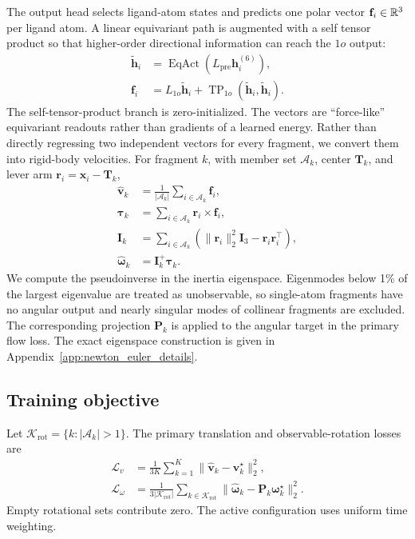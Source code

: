 The output head selects ligand-atom states and predicts one polar vector
\(\mathbf{f}_i\in\mathbb{R}^3\) per ligand atom. A linear equivariant path is augmented
with a self tensor product so that higher-order directional information can
reach the \(1o\) output:
\begin{align}
    \widetilde{\mathbf{h}}_i
    &=
    \operatorname{EqAct}
    (L_{\mathrm{pre}}\mathbf{h}_i^{(6)}),\\
    \mathbf{f}_i
    &=
    L_{1o}\widetilde{\mathbf{h}}_i
    +
    \operatorname{TP}_{1o}
    (\widetilde{\mathbf{h}}_i,\widetilde{\mathbf{h}}_i).
    \label{eq:atom_force_head}
\end{align}
The self-tensor-product branch is zero-initialized. The vectors are
``force-like'' equivariant readouts rather than gradients of a learned energy.
Rather than directly regressing two independent vectors for every fragment,
we convert them into rigid-body velocities. For fragment \(k\), with member set
\(\mathcal{A}_k\), center \(\mathbf{T}_k\), and lever arm
\(\mathbf{r}_i=\mathbf{x}_i-\mathbf{T}_k\),
\begin{align}
    \widehat{\mathbf{v}}_k
    &=
    \frac{1}{|\mathcal{A}_k|}
    \sum_{i\in\mathcal{A}_k}\mathbf{f}_i,
    \label{eq:newton_translation}\\
    \boldsymbol{\tau}_k
    &=
    \sum_{i\in\mathcal{A}_k}
    \mathbf{r}_i\times\mathbf{f}_i,\\
    \mathbf{I}_k
    &=
    \sum_{i\in\mathcal{A}_k}
    \left(
      \|\mathbf{r}_i\|_2^2\mathbf{I}_3
      -\mathbf{r}_i\mathbf{r}_i^\top
    \right),\\
    \widehat{\boldsymbol{\omega}}_k
    &=
    \mathbf{I}_k^{+}\boldsymbol{\tau}_k.
    \label{eq:newton_rotation}
\end{align}
We compute the pseudoinverse in the inertia eigenspace. Eigenmodes below 1\%
of the largest eigenvalue are treated as unobservable, so single-atom
fragments have no angular output and nearly singular modes of collinear
fragments are excluded. The corresponding projection \(\mathbf{P}_k\) is
applied to the angular target in the primary flow loss. The exact eigenspace
construction is given in Appendix~\ref{app:newton_euler_details}.

\subsection{Training objective}
\label{sec:objective}

Let
\(\mathcal{K}_{\mathrm{rot}}=\{k:|\mathcal{A}_k|>1\}\). The primary
translation and observable-rotation losses are
\begin{align}
    \mathcal{L}_{v}
    &=
    \frac{1}{3K}
    \sum_{k=1}^{K}
    \|\widehat{\mathbf{v}}_k-\mathbf{v}^{\star}_k\|_2^2,\\
    \mathcal{L}_{\omega}
    &=
    \frac{1}{3|\mathcal{K}_{\mathrm{rot}}|}
    \sum_{k\in\mathcal{K}_{\mathrm{rot}}}
    \|
      \widehat{\boldsymbol{\omega}}_k
      -\mathbf{P}_k\boldsymbol{\omega}^{\star}_k
    \|_2^2.
    \label{eq:primary_flow_losses}
\end{align}
Empty rotational sets contribute zero. The active configuration uses uniform
time weighting.

